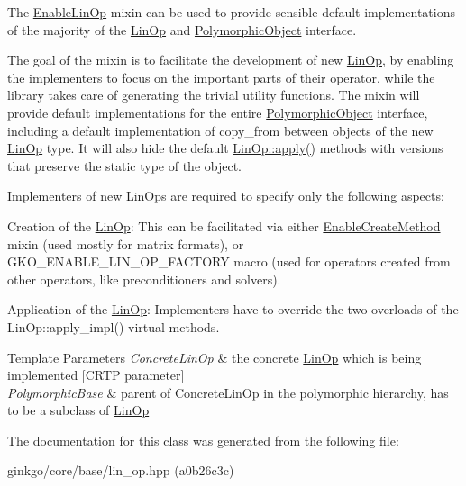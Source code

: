 The \hyperlink{classgko_1_1EnableLinOp}{Enable\+Lin\+Op} mixin can be used to provide sensible default implementations of the majority of the \hyperlink{classgko_1_1LinOp}{Lin\+Op} and \hyperlink{classgko_1_1PolymorphicObject}{Polymorphic\+Object} interface. 

The goal of the mixin is to facilitate the development of new \hyperlink{classgko_1_1LinOp}{Lin\+Op}, by enabling the implementers to focus on the important parts of their operator, while the library takes care of generating the trivial utility functions. The mixin will provide default implementations for the entire \hyperlink{classgko_1_1PolymorphicObject}{Polymorphic\+Object} interface, including a default implementation of {\ttfamily copy\+\_\+from} between objects of the new \hyperlink{classgko_1_1LinOp}{Lin\+Op} type. It will also hide the default \hyperlink{classgko_1_1LinOp_a0449b2fc705d2f970855af23b5e2788e}{Lin\+Op\+::apply()} methods with versions that preserve the static type of the object.

Implementers of new Lin\+Ops are required to specify only the following aspects\+:


\begin{DoxyEnumerate}
\item Creation of the \hyperlink{classgko_1_1LinOp}{Lin\+Op}\+: This can be facilitated via either \hyperlink{classgko_1_1EnableCreateMethod}{Enable\+Create\+Method} mixin (used mostly for matrix formats), or G\+K\+O\+\_\+\+E\+N\+A\+B\+L\+E\+\_\+\+L\+I\+N\+\_\+\+O\+P\+\_\+\+F\+A\+C\+T\+O\+RY macro (used for operators created from other operators, like preconditioners and solvers).
\item Application of the \hyperlink{classgko_1_1LinOp}{Lin\+Op}\+: Implementers have to override the two overloads of the Lin\+Op\+::apply\+\_\+impl() virtual methods.
\end{DoxyEnumerate}


\begin{DoxyTemplParams}{Template Parameters}
{\em Concrete\+Lin\+Op} & the concrete \hyperlink{classgko_1_1LinOp}{Lin\+Op} which is being implemented \mbox{[}C\+R\+TP parameter\mbox{]} \\
\hline
{\em Polymorphic\+Base} & parent of Concrete\+Lin\+Op in the polymorphic hierarchy, has to be a subclass of \hyperlink{classgko_1_1LinOp}{Lin\+Op} \\
\hline
\end{DoxyTemplParams}


The documentation for this class was generated from the following file\+:\begin{DoxyCompactItemize}
\item 
ginkgo/core/base/lin\+\_\+op.\+hpp (a0b26c3c)\end{DoxyCompactItemize}
